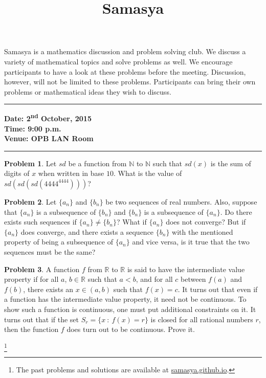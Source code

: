 \documentclass[10pt,a4paper,notitlepage]{article}
\title{\textrm{\textbf{\fontsize{30}{40}\selectfont Samasya}}}
\date{%
    }
\theoremstyle{definition}
\newtheorem{prob}{Problem}
\newcommand\blfootnote[1]{%
  \begingroup
  \renewcommand\thefootnote{}\footnote{#1}%
  \addtocounter{footnote}{-1}%
  \endgroup
}
\begin{document}
\maketitle

Samasya is a mathematics discussion and problem solving club.
We discuss a variety of mathematical topics and solve problems as well.
We encourage participants to have a look at these problems%
before the meeting.
Discussion, however, will not be limited to these problems.
Participants can bring their own problems or mathematical ideas they wish to discuss.\\
\hrule

\textbf{Date: 2\textsuperscript{nd} October, 2015}%
\\
\textbf{Time: 9:00 p.m.}%
\\
\textbf{Venue: OPB LAN Room}%
\\
\hrule


\begin{prob}
Let $sd$ be a function from $\mathbb{N}$ to $\mathbb{N}$ such that $sd(x)$ is the sum of digits of $x$ when written in base $10$. What is the value of $sd(sd(sd(4444^{4444})))$?
\end{prob}

\begin{prob}
Let $\{a_n\}$ and $\{b_n\}$ be two sequences of real numbers. Also, suppose that $\{a_n\}$ is a subsequence of $\{b_n\}$ and $\{b_n\}$ is a subsequence of $\{a_n\}$. Do there exists such sequences if $\{a_n\} \neq \{b_n\}$? What if $\{a_n\}$ does not converge? But if $\{a_n\}$ does converge, and there exists a sequence $\{b_n\}$ with the mentioned property of being a subsequence of $\{a_n\}$ and vice versa, is it true that the two sequences must be the same? 
\end{prob}

\begin{prob}
A function $f$ from $\mathbb{R}$ to $\mathbb{R}$ is said to have the intermediate value property if for all $a$, $b \in \mathbb{R}$ such that $a<b$, and for all $c$ between $f(a)$ and $f(b)$, there exists an $x \in (a,b)$ such that $f(x)=c$. It turns out that even if a function has the intermediate value property, it need not be continuous. To show such a function is continuous, one must put additional constraints on it. It turns out that if the set $S_r = \{x\ :\ f(x)=r\}$ is closed for all rational numbers $r$, then the function $f$ does turn out to be continuous. Prove it.
\end{prob}

\blfootnote{The past problems and solutions are available at \href{http://samasya.github.io}{samasya.github.io}.}
\end{document}
